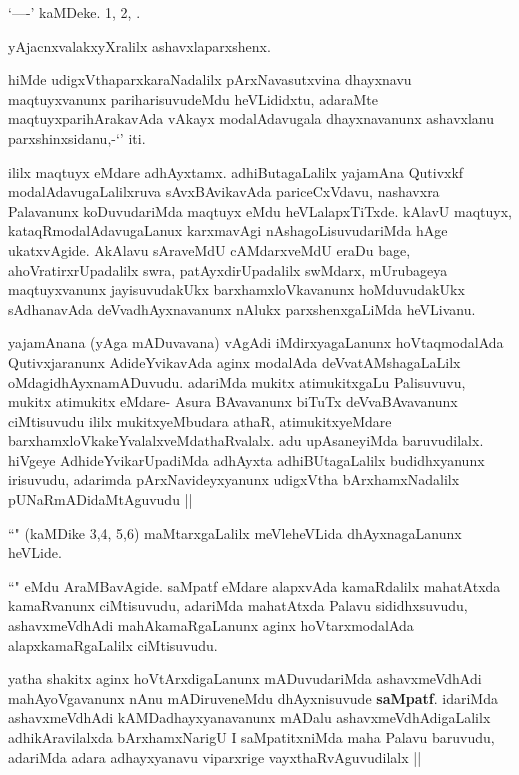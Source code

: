 \begin{artha}
`\stext----' kaMDeke. 1, 2, \stext.

yAjacnxvalakxyXralilx ashavxlaparxshenx.

hiMde udigxVthaparxkaraNadalilx pArxNavasutxvina dhayxnavu maqtuyxvanunx 
pariharisuvudeMdu heVLididxtu, adaraMte maqtuyxparihArakavAda vAkayx modalAdavugala 
dhayxnavanunx ashavxlanu parxshinxsidanu,-`\stext' iti.

ililx maqtuyx eMdare adhAyxtamx. adhiButagaLalilx yajamAna Qutivxkf 
modalAdavugaLalilxruva sAvxBAvikavAda pariceCxVdavu, nashavxra Palavanunx koDuvudariMda 
maqtuyx eMdu heVLalapxTiTxde. kAlavU maqtuyx, kataqRmodalAdavugaLanux karxmavAgi 
nAshagoLisuvudariMda hAge ukatxvAgide. AkAlavu sAraveMdU cAMdarxveMdU eraDu bage, 
ahoVratirxrUpadalilx swra, patAyxdirUpadalilx swMdarx, mUrubageya maqtuyxvanunx 
jayisuvudakUkx barxhamxloVkavanunx hoMduvudakUkx sAdhanavAda deVvadhAyxnavanunx nAlukx 
parxshenxgaLiMda heVLivanu.
\end{artha}

\begin{center}
\end{center}

\begin{artha}
yajamAnana (yAga mADuvavana) vAgAdi iMdirxyagaLanunx hoVtaqmodalAda Qutivxjaranunx AdideYvikavAda aginx modalAda deVvatAMshagaLaLilx oMdagidhAyxnamADuvudu. adariMda mukitx atimukitxgaLu Palisuvuvu, mukitx atimukitx eMdare- Asura BAvavanunx biTuTx deVvaBAvavanunx ciMtisuvudu ililx mukitxyeMbudara athaR, atimukitxyeMdare barxhamxloVkakeYvalalxveMdathaRvalalx. adu upAsaneyiMda baruvudilalx. hiVgeye AdhideYvikarUpadiMda adhAyxta adhiBUtagaLalilx budidhxyanunx irisuvudu, adarimda pArxNavideyxyanunx udigxVtha bArxhamxNadalilx pUNaRmADidaMtAguvudu ||
\end{artha}

\begin{artha}
``\stext" (kaMDike 3,4, 5,6) maMtarxgaLalilx meVleheVLida dhAyxnagaLanunx heVLide.
\end{artha}

\begin{center}
\end{center}

\begin{artha}
``\stext" eMdu AraMBavAgide. saMpatf eMdare alapxvAda kamaRdalilx mahatAtxda kamaRvanunx ciMtisuvudu, adariMda mahatAtxda Palavu sididhxsuvudu, ashavxmeVdhAdi mahAkamaRgaLanunx aginx hoVtarxmodalAda alapxkamaRgaLalilx ciMtisuvudu.

yatha shakitx aginx hoVtArxdigaLanunx mADuvudariMda ashavxmeVdhAdi mahAyoVgavanunx nAnu mADiruveneMdu dhAyxnisuvude \textbf{saMpatf}. idariMda ashavxmeVdhAdi kAMDadhayxyanavanunx mADalu ashavxmeVdhAdigaLalilx adhikAravilalxda bArxhamxNarigU I saMpatitxniMda maha Palavu baruvudu, adariMda adara adhayxyanavu viparxrige vayxthaRvAguvudilalx ||
\end{artha}

